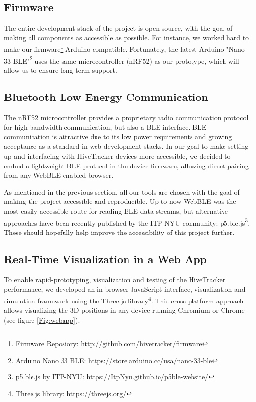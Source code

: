 \documentclass[sigchi]{acmart}
\begin{document}
\subsection{Firmware}

The entire development stack of the project is open source, with the goal of making all components as accessible as possible. For instance, we worked hard to make our firmware\footnote{Firmware Reposiory: \url{http://github.com/hivetracker/firmware}} Arduino compatible. Fortunately, the latest
Arduino "Nano 33 BLE"\footnote{Arduino Nano 33 BLE: \url{https://store.arduino.cc/usa/nano-33-ble}} uses the same microcontroller (nRF52) as our prototype, which will allow us to ensure long term support.

\subsection{Bluetooth Low Energy Communication}

The nRF52 microcontroller provides a proprietary radio communication protocol for high-bandwidth communication, but also a BLE interface. BLE communication is attractive due to its low power requirements and growing acceptance as a standard in web development stacks. In our goal to make setting up and interfacing with HiveTracker devices more accessible, we decided to embed a lightweight BLE protocol in the device firmware, allowing direct pairing from any WebBLE enabled browser.

As mentioned in the previous section, all our tools are chosen with the goal of making the project accessible and reproducible. Up to now WebBLE was the most easily accessible route for reading BLE data streams, but alternative approaches have been recently published by the ITP-NYU community: p5.ble.js\footnote{p5.ble.js by ITP-NYU: \url{https://ItpNyu.github.io/p5ble-website/}}. These should hopefully help improve the accessibility of this project further.


\subsection{Real-Time Visualization in a Web App}

To enable rapid-prototyping, visualization and testing of the HiveTracker performance, we developed an in-browser JavaScript interface, visualization and simulation framework using the Three.js library\footnote{Three.js library: \url{https://threejs.org/}}. This cross-platform approach allows visualizing the 3D positions in any device running Chromium or Chrome (see figure \ref{Fig:webapp}).
\end{document}
